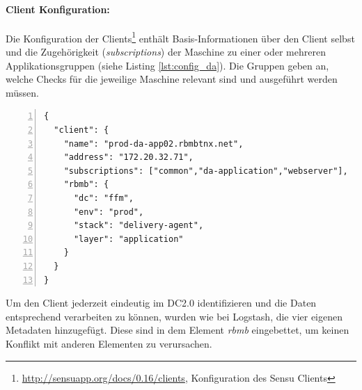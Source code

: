 \paragraph{Client Konfiguration:}
\label{sec:sensu_client}
Die Konfiguration der Clients\footnote{\url{http://sensuapp.org/docs/0.16/clients}, Konfiguration des Sensu Clients} enthält Basis-Informationen über den Client selbst und die Zugehörigkeit (\textit{subscriptions}) der Maschine zu einer oder mehreren Applikationsgruppen (siehe Listing \ref{lst:config_da}). Die Gruppen geben an, welche Checks für die jeweilige Maschine relevant sind und ausgeführt werden müssen.

\begin{lstlisting}[style=code,numbers=left,caption={Beispielhafte Client Konfiguration des Delivery Agent},label={lst:config_da}]
{
  "client": {
    "name": "prod-da-app02.rbmbtnx.net",
    "address": "172.20.32.71",
    "subscriptions": ["common","da-application","webserver"],
    "rbmb": {
      "dc": "ffm",
      "env": "prod",
      "stack": "delivery-agent",
      "layer": "application"
    }
  }
}
\end{lstlisting}

Um den Client jederzeit eindeutig im DC2.0 identifizieren und die Daten entsprechend verarbeiten zu können, wurden wie bei Logstash, die vier eigenen Metadaten hinzugefügt. Diese sind in dem Element \textit{rbmb} eingebettet, um keinen Konflikt mit anderen Elementen zu verursachen.

